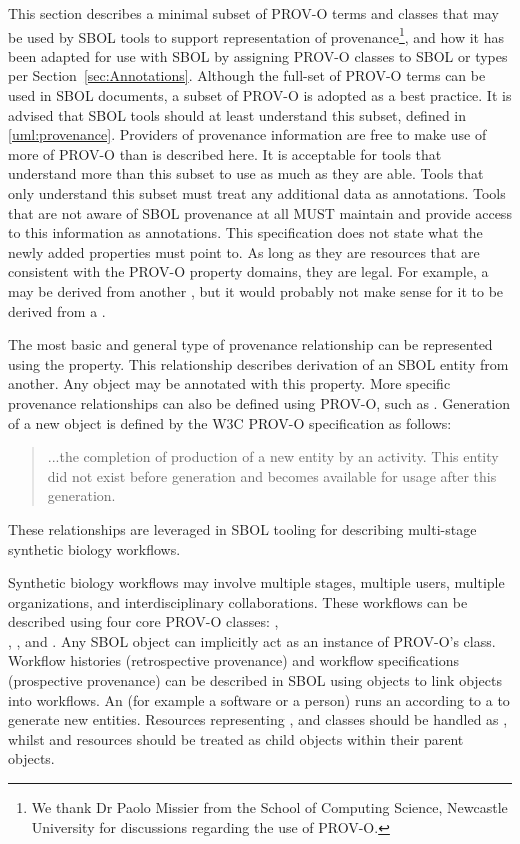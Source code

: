 This section describes a minimal subset of PROV-O terms and classes that may be used by SBOL tools to support representation of provenance\footnote{We thank Dr Paolo Missier from the School of Computing Science, Newcastle University for discussions regarding the use of PROV-O.}, 
and how it has been adapted for use with SBOL by assigning PROV-O classes to SBOL  or  types per  Section~\ref{sec:Annotations}.
%
 Although the full-set of PROV-O terms can be used in SBOL documents, a subset of PROV-O is adopted as a best practice. It is advised that SBOL tools should at least understand this subset, defined in \ref{uml:provenance}. Providers of provenance information are free to make use of more of PROV-O than is described here. It is acceptable for tools that understand more than this subset to use as much as they are able. Tools that only understand this subset must treat any additional data as annotations. Tools that are not aware of SBOL provenance at all MUST maintain and provide access to this information as annotations. This specification does not state what the newly added properties must point to. As long as they are resources that are consistent with the PROV-O property domains, they are legal. For example, a  may be derived from another , but it would probably not make sense for it to be derived from a .

The most basic and general type of provenance relationship can be represented using the  property. This relationship describes derivation of an SBOL entity from another. 
Any  object may be annotated with this property. More specific provenance relationships can also be defined using PROV-O, such as . Generation of a new object is defined by the W3C PROV-O specification as follows:
\begin{quote}
	...the completion of production of a new entity by an activity. This entity did not exist before generation and becomes available for usage after this generation.
\end{quote}
These relationships are leveraged in SBOL tooling for describing multi-stage synthetic biology workflows.

Synthetic biology workflows may involve multiple stages, multiple users, multiple organizations, and interdisciplinary collaborations. These workflows can be described using four core PROV-O classes: , \\ , , and . Any SBOL  object can implicitly act as an instance of PROV-O's  class. Workflow histories (retrospective provenance) and workflow specifications (prospective provenance) can be described in SBOL using  objects to link  objects into workflows. An  (for example a software or a person) runs an  according to a  to generate new entities. Resources representing ,  and  classes should be handled as , whilst  and  resources should be treated as child  objects within their parent  objects.  

